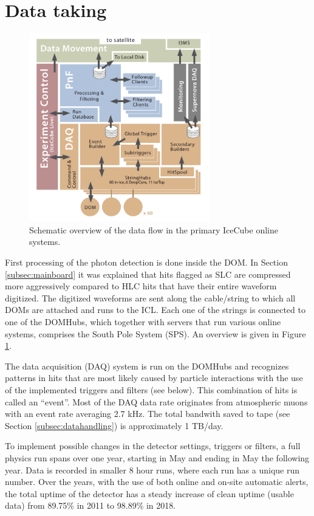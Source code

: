 \section{Data taking}
\label{sec:datataking}

\begin{figure}[ht]
\centering
\includegraphics[width=0.7\textwidth]{chapter5/img/dataflow.png}
\caption{Schematic overview of the data flow in the primary IceCube online systems.}
\label{fig:dataflow}
\end{figure}
First processing of the photon detection is done inside the DOM. In Section \ref{subsec:mainboard} it was explained that hits flagged as SLC are compressed more aggressively compared to HLC hits that have their entire waveform digitized. The digitized waveforms are sent along the cable/string to which all DOMs are attached and runs to the ICL. Each one of the strings is connected to one of the DOMHubs, which together with servers that run various online systems, comprises the South Pole System (SPS). An overview is given in Figure \ref{fig:dataflow}.

The data acquisition (DAQ) system is run on the DOMHubs and recognizes patterns in hits that are most likely caused by particle interactions with the use of the implemented triggers and filters (see below). This combination of hits is called an ``event''. Most of the DAQ data rate originates from atmospheric muons with an event rate averaging 2.7 kHz. The total bandwith saved to tape (see Section \ref{subsec:datahandling}) is approximately 1 TB/day.

To implement possible changes in the detector settings, triggers or filters, a full physics run spans over one year, starting in May and ending in May the following year. Data is recorded in smaller 8 hour runs, where each run has a unique run number. Over the years, with the use of both online and on-site automatic alerts, the total uptime of the detector has a steady increase of clean uptime (usable data) from 89.75\% in 2011 to 98.89\% in 2018.

